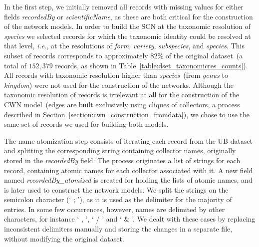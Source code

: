 In the first step, we initially removed all records with missing values for either fields \textit{recordedBy} or \textit{scientificName}, as these are both critical for the construction of the network models.
In order to build the SCN at the taxonomic resolution of \textit{species} we selected records for which the taxonomic identity could be resolved at that level, \textit{i.e.}, at the resolutions of \textit{form}, \textit{variety}, \textit{subspecies}, and \textit{species}. 
This subset of records corresponds to approximately $82\%$ of the original dataset~(a total of $152,379$ records, as shown in Table~\ref{table:dset_taxonomicres_counts}).
All records with taxonomic resolution higher than \textit{species}~(from \textit{genus} to \textit{kingdom}) were not used for the construction of the networks.
Although the taxonomic resolution of records is irrelevant at all for the construction of the CWN model~(edges are built exclusively using cliques of collectors, a process described in Section~\ref{section:cwn_construction_fromdata}), we chose to use the same set of records we used for building both models.

The name atomization step consists of iterating each record from the UB dataset and splitting the corresponding string containing collector names, originally stored in the \textit{recordedBy} field. 
The process originates a list of strings for each record, containing atomic names for each collector associated with it.
A new field named \textit{recordedBy\_atomized} is created for holding the lists of atomic names, and is later used to construct the network models.
We split the strings on the semicolon character (` ; '), as it is used as the delimiter for the majority of entries.
In some few occurrences, however, names are delimited by other characters, for instance ` , ', ` / ' and ` \& '.
We dealt with these cases by replacing inconsistent delimiters manually and storing the changes in a separate file, without modifying the original dataset.

